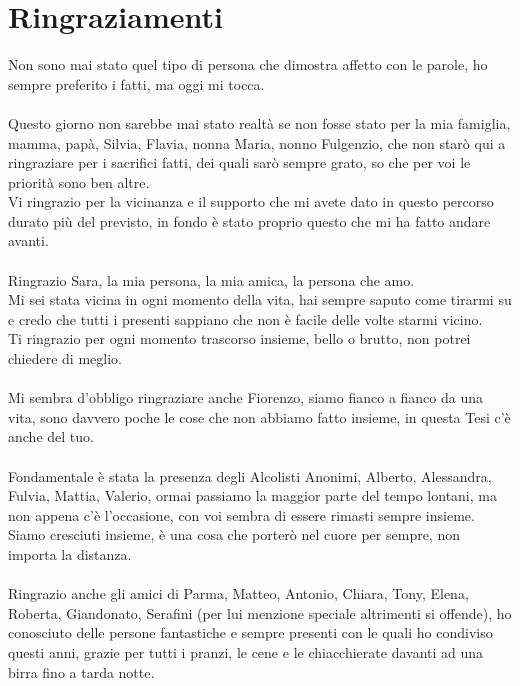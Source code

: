 \chapter*{Ringraziamenti} %

Non sono mai stato quel tipo di persona che dimostra affetto con le parole, ho sempre preferito i fatti, ma oggi mi tocca. 
\\ \\
Questo giorno non sarebbe mai stato realtà se non fosse stato per la mia famiglia, mamma, papà, Silvia, Flavia, nonna Maria, nonno Fulgenzio, 
che non starò qui a ringraziare per i sacrifici fatti, dei quali sarò sempre grato, so che per voi le priorità sono ben altre. \\
Vi ringrazio per la vicinanza e il supporto che mi avete dato in questo percorso durato più del previsto, in fondo è stato proprio questo che mi ha fatto andare avanti. \\ \\

Ringrazio Sara, la mia persona, la mia amica, la persona che amo. \\
Mi sei stata vicina in ogni momento della vita, hai sempre saputo come tirarmi su e credo che tutti i presenti sappiano che non è facile delle volte starmi vicino. \\
Ti ringrazio per ogni momento trascorso insieme, bello o brutto, non potrei chiedere di meglio. \\ \\

Mi sembra d'obbligo ringraziare anche Fiorenzo, siamo fianco a fianco da una vita, sono davvero poche le cose che non abbiamo fatto insieme, in questa Tesi c'è anche del tuo. \\ \\

Fondamentale è stata la presenza degli Alcolisti Anonimi, Alberto, Alessandra, Fulvia, Mattia, Valerio, ormai passiamo la maggior parte del tempo lontani, 
ma non appena c'è l'occasione, con voi sembra di essere rimasti sempre insieme. Siamo cresciuti insieme, è una cosa che porterò nel cuore per sempre, non importa la distanza. \\ \\

Ringrazio anche gli amici di Parma, Matteo, Antonio, Chiara, Tony, Elena, Roberta, Giandonato, Serafini (per lui menzione speciale altrimenti si offende), 
ho conosciuto delle persone fantastiche e sempre presenti con le quali ho condiviso questi anni, grazie per tutti i pranzi, le cene e le chiacchierate davanti 
ad una birra fino a tarda notte. \\ \\


